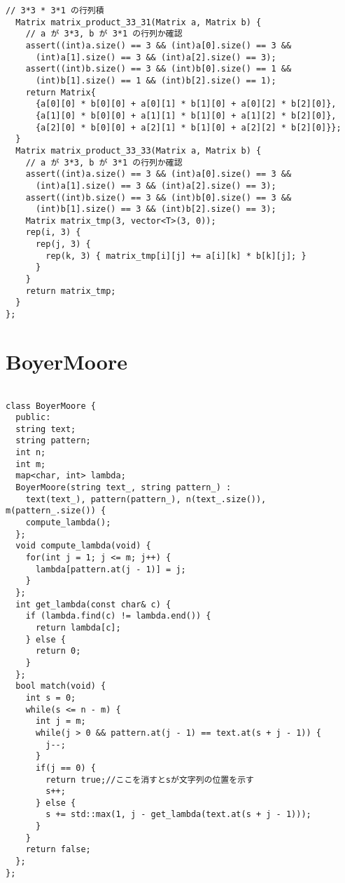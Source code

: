 \documentclass[a4j,titlepage]{jarticle} %
\begin{document}
\begin{lstlisting}[caption=AffineMap]
  // 3*3 * 3*1 の行列積
  Matrix matrix_product_33_31(Matrix a, Matrix b) {
    // a が 3*3, b が 3*1 の行列か確認
    assert((int)a.size() == 3 && (int)a[0].size() == 3 &&
      (int)a[1].size() == 3 && (int)a[2].size() == 3);
    assert((int)b.size() == 3 && (int)b[0].size() == 1 &&
      (int)b[1].size() == 1 && (int)b[2].size() == 1);
    return Matrix{
      {a[0][0] * b[0][0] + a[0][1] * b[1][0] + a[0][2] * b[2][0]},
      {a[1][0] * b[0][0] + a[1][1] * b[1][0] + a[1][2] * b[2][0]},
      {a[2][0] * b[0][0] + a[2][1] * b[1][0] + a[2][2] * b[2][0]}};
  }
  Matrix matrix_product_33_33(Matrix a, Matrix b) {
    // a が 3*3, b が 3*1 の行列か確認
    assert((int)a.size() == 3 && (int)a[0].size() == 3 &&
      (int)a[1].size() == 3 && (int)a[2].size() == 3);
    assert((int)b.size() == 3 && (int)b[0].size() == 3 &&
      (int)b[1].size() == 3 && (int)b[2].size() == 3);
    Matrix matrix_tmp(3, vector<T>(3, 0));
    rep(i, 3) {
      rep(j, 3) {
        rep(k, 3) { matrix_tmp[i][j] += a[i][k] * b[k][j]; }
      }
    }
    return matrix_tmp;
  }
};

\end{lstlisting}

\color{white}
\section{BoyerMoore}
\color{black}
\begin{lstlisting}[caption=BoyerMoore]

class BoyerMoore {
  public:
  string text;
  string pattern;
  int n;
  int m;
  map<char, int> lambda;
  BoyerMoore(string text_, string pattern_) : 
    text(text_), pattern(pattern_), n(text_.size()), m(pattern_.size()) {
    compute_lambda();
  };
  void compute_lambda(void) {
    for(int j = 1; j <= m; j++) {
      lambda[pattern.at(j - 1)] = j;
    }
  };
  int get_lambda(const char& c) {
    if (lambda.find(c) != lambda.end()) {
      return lambda[c];
    } else {
      return 0;
    }
  };
  bool match(void) {
    int s = 0;
    while(s <= n - m) {
      int j = m;
      while(j > 0 && pattern.at(j - 1) == text.at(s + j - 1)) {
        j--;
      }
      if(j == 0) {
        return true;//ここを消すとsが文字列の位置を示す
        s++;
      } else {
        s += std::max(1, j - get_lambda(text.at(s + j - 1)));
      }
    }
    return false;
  };
};

\end{lstlisting}

\color{white}
\end{document}
